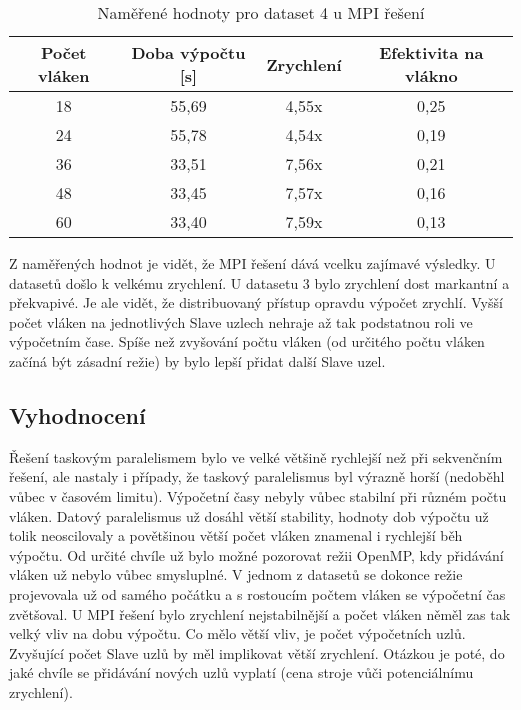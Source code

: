 \documentclass[a4paper,10pt]{article}
\begin{document}
\begin{table}[H]
\centering
\begin{tabular}{|c|c|c|c|}
\hline
Počet vláken & Doba výpočtu {[}s{]} & Zrychlení & Efektivita na vlákno \\ \hline
18           & 55,69                & 4,55x     & 0,25                 \\
24           & 55,78                & 4,54x     & 0,19                 \\
36           & 33,51                & 7,56x     & 0,21                 \\
48           & 33,45                & 7,57x     & 0,16                 \\
60           & 33,40                & 7,59x     & 0,13                 \\ \hline
\end{tabular}
\caption{Naměřené hodnoty pro dataset 4 u MPI řešení}
\end{table}

Z naměřených hodnot je vidět, že MPI řešení dává vcelku zajímavé výsledky. U datasetů došlo k velkému zrychlení. U datasetu 3 bylo zrychlení dost markantní a překvapivé. Je ale vidět, že distribuovaný přístup opravdu výpočet zrychlí. Vyšší počet vláken na jednotlivých Slave uzlech nehraje až tak podstatnou roli ve výpočetním čase. Spíše než zvyšování počtu vláken (od určitého počtu vláken začíná být zásadní režie) by bylo lepší přidat další Slave uzel.

\subsection*{Vyhodnocení}

Řešení taskovým paralelismem bylo ve velké většině rychlejší než při sekvenčním řešení, ale nastaly i případy, že taskový paralelismus byl výrazně horší (nedoběhl vůbec v časovém limitu). Výpočetní časy nebyly vůbec stabilní při různém počtu vláken. Datový paralelismus už dosáhl větší stability, hodnoty dob výpočtu už tolik neoscilovaly a povětšinou větší počet vláken znamenal i rychlejší běh výpočtu. Od určité chvíle už bylo možné pozorovat režii OpenMP, kdy přidávání vláken už nebylo vůbec smysluplné. V jednom z datasetů se dokonce režie projevovala už od samého počátku a s rostoucím počtem vláken se výpočetní čas zvětšoval. U MPI řešení bylo zrychlení nejstabilnější a počet vláken něměl zas tak velký vliv na dobu výpočtu. Co mělo větší vliv, je počet výpočetních uzlů. Zvyšující počet Slave uzlů by měl implikovat větší zrychlení. Otázkou je poté, do jaké chvíle se přidávání nových uzlů vyplatí (cena stroje vůči potenciálnímu zrychlení).
\end{document}
